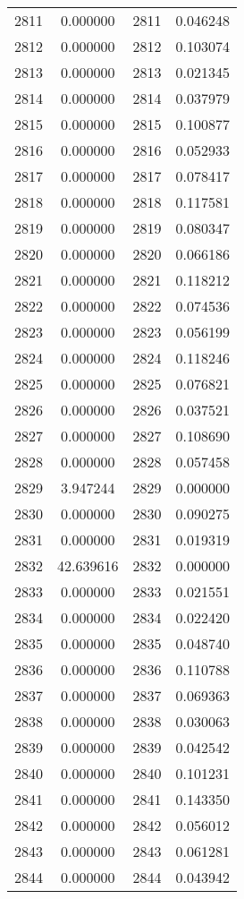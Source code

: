 \documentclass[12pt]{article}
\begin{document}
\begin{longtable}{@{}cccc@{}}
2811 & 0.000000 & 2811 & 0.046248 \\
2812 & 0.000000 & 2812 & 0.103074 \\
2813 & 0.000000 & 2813 & 0.021345 \\
2814 & 0.000000 & 2814 & 0.037979 \\
2815 & 0.000000 & 2815 & 0.100877 \\
2816 & 0.000000 & 2816 & 0.052933 \\
2817 & 0.000000 & 2817 & 0.078417 \\
2818 & 0.000000 & 2818 & 0.117581 \\
2819 & 0.000000 & 2819 & 0.080347 \\
2820 & 0.000000 & 2820 & 0.066186 \\
2821 & 0.000000 & 2821 & 0.118212 \\
2822 & 0.000000 & 2822 & 0.074536 \\
2823 & 0.000000 & 2823 & 0.056199 \\
2824 & 0.000000 & 2824 & 0.118246 \\
2825 & 0.000000 & 2825 & 0.076821 \\
2826 & 0.000000 & 2826 & 0.037521 \\
2827 & 0.000000 & 2827 & 0.108690 \\
2828 & 0.000000 & 2828 & 0.057458 \\
2829 & 3.947244 & 2829 & 0.000000 \\
2830 & 0.000000 & 2830 & 0.090275 \\
2831 & 0.000000 & 2831 & 0.019319 \\
2832 & 42.639616 & 2832 & 0.000000 \\
2833 & 0.000000 & 2833 & 0.021551 \\
2834 & 0.000000 & 2834 & 0.022420 \\
2835 & 0.000000 & 2835 & 0.048740 \\
2836 & 0.000000 & 2836 & 0.110788 \\
2837 & 0.000000 & 2837 & 0.069363 \\
2838 & 0.000000 & 2838 & 0.030063 \\
2839 & 0.000000 & 2839 & 0.042542 \\
2840 & 0.000000 & 2840 & 0.101231 \\
2841 & 0.000000 & 2841 & 0.143350 \\
2842 & 0.000000 & 2842 & 0.056012 \\
2843 & 0.000000 & 2843 & 0.061281 \\
2844 & 0.000000 & 2844 & 0.043942 \\

\end{longtable}
\end{document}
